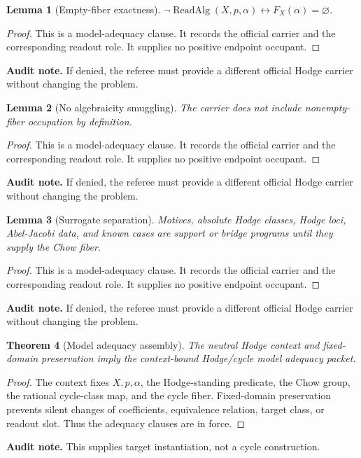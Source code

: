\documentclass[11pt]{article}
\newtheorem{theorem}{Theorem}[section]
\newtheorem{lemma}[theorem]{Lemma}
\newcommand{\ReadAlg}{\operatorname{ReadAlg}}
\begin{document}
\begin{lemma}[Empty-fiber exactness]
$\neg\ReadAlg(X,p,\alpha)\leftrightarrow F_X(\alpha)=\varnothing$.
\end{lemma}
\begin{proof}
This is a model-adequacy clause. It records the official carrier and the corresponding readout role. It supplies no positive endpoint occupant.
\end{proof}
\par\noindent\textbf{Audit note.} If denied, the referee must provide a different official Hodge carrier without changing the problem.


\begin{lemma}[No algebraicity smuggling]
The carrier does not include nonempty-fiber occupation by definition.
\end{lemma}
\begin{proof}
This is a model-adequacy clause. It records the official carrier and the corresponding readout role. It supplies no positive endpoint occupant.
\end{proof}
\par\noindent\textbf{Audit note.} If denied, the referee must provide a different official Hodge carrier without changing the problem.


\begin{lemma}[Surrogate separation]
Motives, absolute Hodge classes, Hodge loci, Abel-Jacobi data, and known cases are support or bridge programs until they supply the Chow fiber.
\end{lemma}
\begin{proof}
This is a model-adequacy clause. It records the official carrier and the corresponding readout role. It supplies no positive endpoint occupant.
\end{proof}
\par\noindent\textbf{Audit note.} If denied, the referee must provide a different official Hodge carrier without changing the problem.


\begin{theorem}[Model adequacy assembly]
The neutral Hodge context and fixed-domain preservation imply the context-bound Hodge/cycle model adequacy packet.
\end{theorem}
\begin{proof}
The context fixes $X,p,\alpha$, the Hodge-standing predicate, the Chow group, the rational cycle-class map, and the cycle fiber. Fixed-domain preservation prevents silent changes of coefficients, equivalence relation, target class, or readout slot. Thus the adequacy clauses are in force.
\end{proof}
\par\noindent\textbf{Audit note.} This supplies target instantiation, not a cycle construction.
\end{document}
